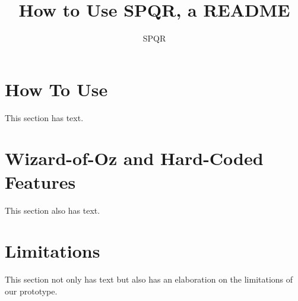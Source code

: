 \documentclass{article}
\title{How to Use SPQR, a README}
\author{SPQR}
\begin{document}
\maketitle

\section{How To Use}
This section has text.

\section{Wizard-of-Oz and Hard-Coded Features}
This section also has text.


\section{Limitations}
This section not only has text but also has an elaboration on the limitations of our prototype.
\end{document}

